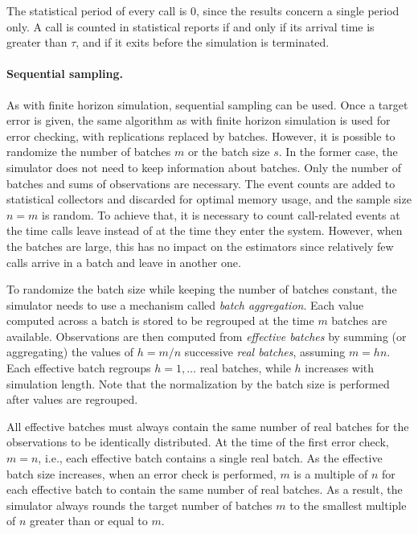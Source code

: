 The statistical period of every call is 0, since the results
concern a single period only.
A call is counted in statistical reports if and only if its arrival
time is greater than $\tau$, and if it exits before the simulation is
terminated.

\paragraph{Sequential sampling.}
As with finite horizon simulation, sequential sampling can be used.
Once a target error is given, the same
algorithm as with finite horizon simulation is used for error
checking, with replications replaced by batches.  However, it is
possible to randomize the number of batches $m$ or the batch size
$s$.  In the former case, the simulator does not need to keep
information about batches.  Only the number of batches and sums of
observations are necessary.  The event counts are added to statistical
collectors and discarded for optimal memory usage, and the sample size
$n=m$ is random.  To achieve that,
it is necessary to count call-related events at the time calls leave
instead of at the time they enter the system.  However, when the
batches are
large, this has no impact on the estimators since relatively few calls
arrive in a batch and leave in another one.

To randomize the batch size while keeping the number of batches constant,
the simulator needs to use a mechanism called \emph{batch
  aggregation}.  Each value computed across a batch is stored to
be regrouped at the time $m$ batches are available.
Observations are then computed from \emph{effective batches}
by summing (or aggregating) the values of $h=m/n$ successive
\emph{real batches}, assuming $m=hn$.  Each effective batch regroups
$h=1,\ldots$ real batches, while $h$ increases with simulation length.
Note that the normalization by the batch size is performed after
values are regrouped.

All effective batches must always contain the same
number of real batches for the observations to be identically distributed.
At the time of the first error check, $m=n$, i.e., each effective
batch
contains a single real batch.  As the effective batch size increases,
when an
error check is performed, $m$ is a multiple of $n$ for each effective
batch to contain the same number of real batches.  As a result,
the simulator always
rounds the target number of batches $m$ to the smallest multiple of
$n$ greater than or equal to $m$.

